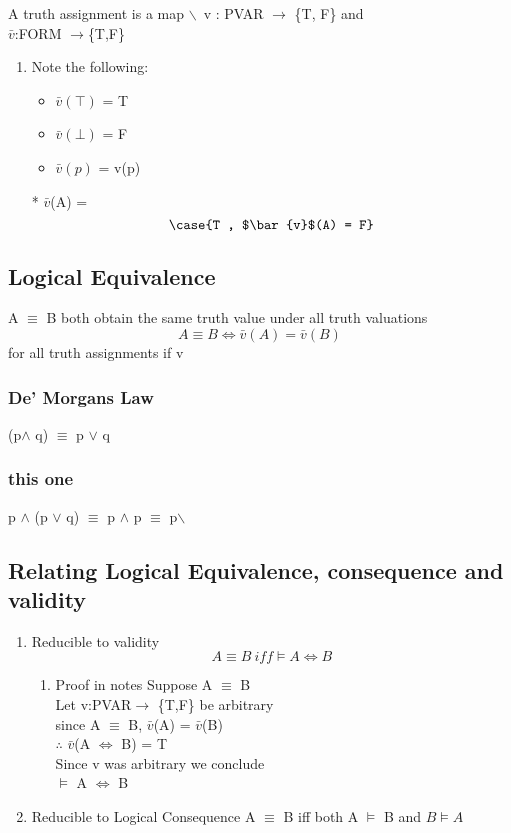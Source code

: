 \documentclass[11pt]{article}
\begin{document}
A truth assignment is  a map $\backslash$\ v : PVAR \(\rightarrow\) \{T, F\} and \\
\(\bar{v}\):FORM \(\rightarrow\)\{T,F\}
\begin{enumerate}
\item Note the following:
\label{sec:orgd1dffb9}
\begin{itemize}
\item \(\bar{v}(\top)\) = T
\item \(\bar{v}(\bot)\) = F
\item \(\bar{v}(p)\) = v(p)
\end{itemize}
* $\bar{v}$(\not A) = $$\case{T , $\bar{v}$(A) = F}$$
\end{enumerate}
\subsection{Logical Equivalence}
\label{sec:org78ae8dd}
A \(\equiv\) B both obtain the same truth value under all truth valuations \\
$$A \equiv B \iff \bar{v}(A) = \bar{v}(B)$$ for all truth assignments if v
\subsubsection{De' Morgans Law}
\label{sec:org4652064}
\textlnot{}(p\(\land\) q) \(\equiv\) \textlnot{} p \(\lor\) \textlnot{} q
\subsubsection{this one}
\label{sec:orgab86df3}
p \(\land\) (p \(\lor\) q) \(\equiv\) p \(\land\) p \(\equiv\) p$\backslash$
\subsection{Relating Logical Equivalence, consequence and validity}
\label{sec:org01c9f93}
\begin{enumerate}
\item Reducible to validity
\label{sec:orgdb38a9f}
$$A \equiv B\  iff \models A \iff B $$
\begin{enumerate}
\item Proof in notes
\label{sec:orgbd934f0}
Suppose A \(\equiv\) B \\
Let v:PVAR\(\rightarrow\) \{T,F\} be arbitrary \\
since A \(\equiv\) B, \(\bar{v}\)(A) = \(\bar{v}\)(B) \\
\(\therefore\) \(\bar{v}\)(A \(\iff\) B) = T \\
Since v was arbitrary we conclude \\
\(\models\) A \(\iff\) B
\end{enumerate}
\item Reducible to Logical Consequence
\label{sec:org9eeb075}
A \(\equiv\) B iff both A \(\models\) B and \(B \models A\)
\end{enumerate}
\end{document}

